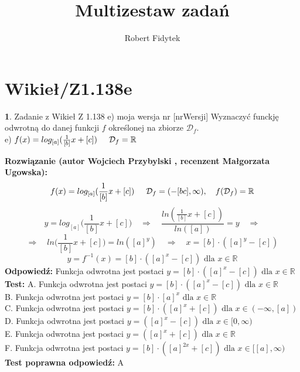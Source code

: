 \documentclass[12pt, a4paper]{article}
\title{Multizestaw zadań}
\author{Robert Fidytek}
\date{}
\theoremstyle{definition} %
\newtheorem{zad}{}
\newcommand{\kategoria}[1]{\section{#1}} %
\newcommand{\zadStart}[1]{\begin{zad}#1\newline} %
\newcommand{\zadStop}{\end{zad}}   %
\newcommand{\rozwStart}[2]{\noindent \textbf{Rozwiązanie (autor #1 , recenzent #2): }\newline} %
\newcommand{\rozwStop}{\newline}                                            %
\newcommand{\odpStart}{\noindent \textbf{Odpowiedź:}\newline}    %
\newcommand{\odpStop}{\newline}                                             %
\newcommand{\testStart}{\noindent \textbf{Test:}\newline} %
\newcommand{\testStop}{\newline} %
\newcommand{\kluczStart}{\noindent \textbf{Test poprawna odpowiedź:}\newline} %
\newcommand{\kluczStop}{\newline} %
\begin{document}
\maketitle


\kategoria{Wikieł/Z1.138e}
\zadStart{Zadanie z Wikieł Z 1.138 e) moja wersja nr [nrWersji]}
Wyznaczyć funckję odwrotną do danej funkcji $f$ określonej na zbiorze $\mathcal{D}_{f}$.\\
e) $f(x)=log_{[a]}(\frac{1}{[b]}x+[c])\hspace{5mm}\mathcal{D}_{f}=\mathbb{R}$
\zadStop
\rozwStart{Wojciech Przybylski}{Małgorzata Ugowska}
$$f(x)=log_{[a]}(\frac{1}{[b]}x+[c])\hspace{5mm} \mathcal{D}_{f}=(-[bc],\infty), \quad f(\mathcal{D}_{f})=\mathbb{R}$$
$$y=log_{[a]}\Big(\frac{1}{[b]}x+[c]\Big) \quad \Rightarrow \quad \frac{ln(\frac{1}{[b]}x+[c])}{ln([a])}=y \quad \Rightarrow $$
$$\Rightarrow \quad ln\Big(\frac{1}{[b]}x+[c]\Big)=ln([a]^{y}) \quad \Rightarrow \quad x=[b]\cdot([a]^{y}-[c])$$
$$y=f^{-1}(x)=[b]\cdot([a]^{x}-[c]) \mbox{ dla } x\in \mathbb{R}$$
\rozwStop
\odpStart
Funkcja odwrotna jest postaci $y=[b]\cdot([a]^{x}-[c]) \mbox{ dla }x\in \mathbb{R}$
\odpStop
\testStart
A. Funkcja odwrotna jest postaci $y=[b]\cdot([a]^{x}-[c])  \mbox{ dla }x\in\mathbb{R}$\\
B. Funkcja odwrotna jest postaci $y=[b]\cdot[a]^{x} \mbox{ dla }x\in\mathbb{R}$\\
C. Funkcja odwrotna jest postaci $y=[b]\cdot([a]^{x}+[c])  \mbox{ dla }x\in(-\infty,[a])$\\
D. Funkcja odwrotna jest postaci $y=([a]^{x}-[c]) \mbox{ dla }x\in[0,\infty)$\\
E. Funkcja odwrotna jest postaci $y=([a]^{x}+[c]) \mbox{ dla }x\in \mathbb{R}$\\
F. Funkcja odwrotna jest postaci $y=[b]\cdot([a]^{2x}+[c])\mbox{ dla }x\in[[a],\infty)$
\testStop
\kluczStart
A
\kluczStop
\end{document}
